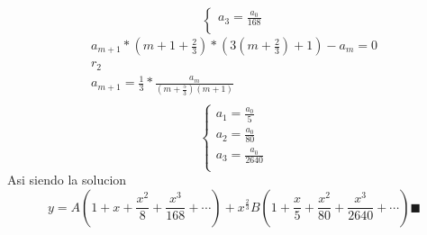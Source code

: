 \begin{mdframed}
\begin{equation}
\begin{cases}
        a_3=\frac{a_0}{168}\\
    \end{cases}
\end{equation}
\begin{gather*}
    a_{m+1}*(m+1+\frac{2}{3})*(3(m+\frac{2}{3})+1)-a_m=0\\
    r_2\\
    a_{m+1}=\frac{1}{3}*\frac{a_m}{(m+\frac{5}{3})(m+1)}\\
\end{gather*}
  \begin{equation}
    \begin{cases}
        a_1=\frac{a_0}{5}\\
        a_2=\frac{a_0}{80}\\
        a_3=\frac{a_0}{2640}\\
    \end{cases}
\end{equation}
Asi siendo la solucion
$$y = A(1+x+\frac{x^2}{8}+\frac{x^3}{168}+\cdots)+x^{\frac{2}{3}}B(1+\frac{x}{5}+\frac{x^2}{80}+\frac{x^3}{2640}+\cdots) \blacksquare$$
\end{mdframed}
